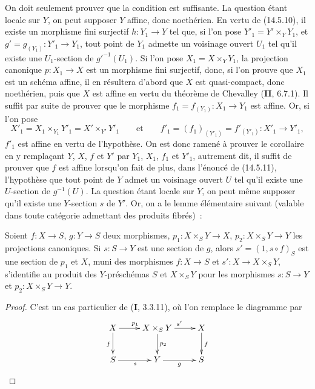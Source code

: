 On doit seulement prouver que la condition est suffisante. La question étant locale
sur $Y$, on peut supposer $Y$ affine, donc noethérien. En vertu de (14.5.10), il
existe un morphisme fini surjectif $h:Y_1\to Y$ tel que, si l'on pose
$Y'_1=Y'\times_Y Y_1$, et $g'=g_{(Y_1)}:Y'_1\to Y_1$, tout point de $Y_1$ admette
un voisinage ouvert $U_1$ tel qu'il existe une $U_1$-section de $g'^{-1}(U_1)$. Si
l'on pose $X_1=X\times_Y Y_1$, la projection canonique $p:X_1\to X$ est un
morphisme fini surjectif, donc, si l'on prouve que $X_1$ est un schéma affine, il en
résultera d'abord que $X$ est quasi-compact, donc noethérien, puis que $X$ est affine
en vertu du théorème de Chevalley (\textbf{II}, 6.7.1). Il suffit par suite de
prouver que le morphisme $f_1=f_{(Y_1)}:X_1\to Y_1$ est affine. Or, si l'on pose
\[
  X'_1=X_1\times_{Y_1}Y'_1=X'\times_{Y'}Y'_1
  \qquad\text{et}\qquad
  f'_1=(f_1)_{(Y'_1)}=f'_{(Y'_1)}:X'_1\to Y'_1,
\]
$f'_1$ est affine en vertu de l'hypothèse. On est donc ramené à prouver le corollaire
en y remplaçant $Y$, $X$, $f$ et $Y'$ par $Y_1$, $X_1$, $f_1$ et $Y'_1$,
autrement dit, il suffit de prouver que $f$ est affine lorsqu'on fait de plus, dans
l'énoncé de (14.5.11), l'hypothèse que tout point de $Y$ admet un voisinage ouvert
$U$ tel qu'il existe une $U$-section de $g^{-1}(U)$. La question étant locale sur
$Y$, on peut même supposer qu'il existe une $Y$-section $s$ de $Y'$. Or, on a le
lemme élémentaire suivant (valable dans toute catégorie admettant des produits
fibrés)~:

\begin{lemma}[14.5.11.1]
\label{IV.14.5.11.1-fr}
Soient $f:X\to S$, $g:Y\to S$ deux morphismes, $p_1:X\times_S Y\to X$,
$p_2:X\times_S Y\to Y$ les projections canoniques. Si $s:S\to Y$ est une section
de $g$, alors $s'=(1,s\circ f)_S$ est une section de $p_1$ et $X$, muni des
morphismes $f:X\to S$ et $s':X\to X\times_S Y$, s'identifie au produit des
$Y$-préschémas $S$ et $X\times_S Y$ pour les morphismes $s:S\to Y$ et
$p_2:X\times_S Y\to Y$.
\end{lemma}


\begin{proof}
C'est un cas particulier de (\textbf{I}, 3.3.11), où l'on remplace le diagramme par
\[
  \xymatrix{
    X \ar[r]^{p_1} \ar[d]_{f} & X\times_S Y \ar[r]^{s'} \ar[d]^{p_2} & X \ar[d]^{f} \\
    S \ar[r]_{s} & Y \ar[r]_{g} & S
  }
\]
\end{proof}

